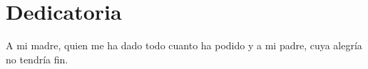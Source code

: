 \chapter*{Dedicatoria}

A mi madre, quien me ha dado todo cuanto ha podido y
a mi padre, cuya alegría no tendría fin.